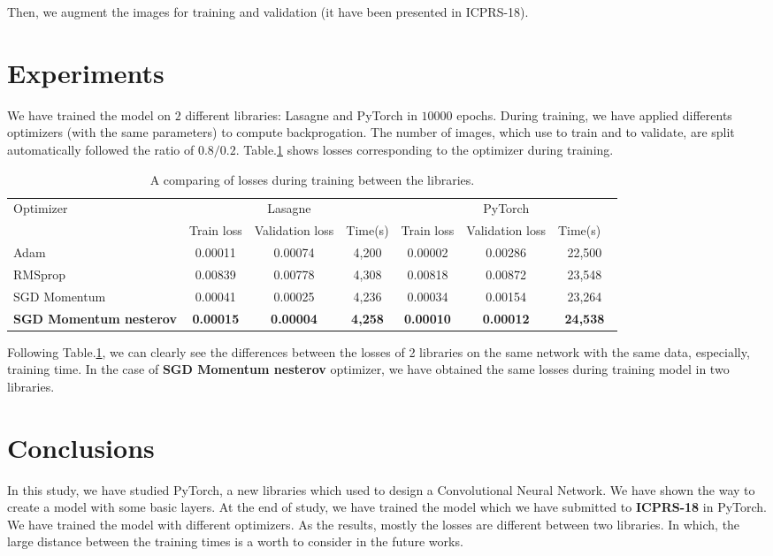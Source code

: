 \documentclass[12pt,a4paper]{article}
\begin{document}
Then, we augment the images for training and validation (it have been presented in ICPRS-18).

\section{Experiments}
We have trained the model on $2$ different libraries: Lasagne \cite{lasagne} and PyTorch in $10000$ epochs. During training, we have applied differents optimizers (with the same parameters) to compute backprogation. The number of images, which use to train and to validate, are split automatically followed the ratio of $0.8/0.2$. Table.\ref{tab2} shows losses corresponding to the optimizer during training.

\begin{table}[htbp]
\centering
\begin{tabular}{ | p{2cm} | c | c | c | c | c | c | }
\hline
	\multicolumn{1}{|p{2cm}|}{\multirow{2}{*}{Optimizer}} & \multicolumn{3}{c|}{Lasagne} &  \multicolumn{3}{c|}{PyTorch}  \\ \cline{2-7}
	 & Train loss & Validation loss & Time(s) & Train loss & Validation loss & Time(s) \  \\ \hline
	Adam & 0.00011 & 0.00074 & 4,200 & 0.00002 & 0.00286 & 22,500 \\ \hline
	RMSprop & 0.00839 & 0.00778 & 4,308 & 0.00818 & 0.00872 & 23,548 \\ \hline
	SGD Momentum & 0.00041 & 0.00025 & 4,236 & 0.00034 & 0.00154 & 23,264 \\ \hline
	\textbf{SGD Momentum nesterov} & \textbf{0.00015} & \textbf{0.00004} & \textbf{4,258} & \textbf{0.00010} & \textbf{0.00012} & \textbf{24,538} \\ \hline
\end{tabular}
\caption{\small{A comparing of losses during training between the libraries.}}
\label{tab2}
\end{table}
Following Table.\ref{tab2}, we can clearly see the differences between the losses of 2 libraries on the same network with the same data, especially, training time. In the case of \textbf{SGD Momentum nesterov} optimizer, we have obtained the same losses during training model in two libraries.
\section{Conclusions}
In this study, we have studied PyTorch, a new libraries which used to design a Convolutional Neural Network. We have shown the way to create a model with some basic layers. At the end of study, we have trained the model which we have submitted to \textbf{ICPRS-18} in PyTorch. We have trained the model with different optimizers. As the results, mostly the losses are different between two libraries. In which, the large distance between the training times is a worth to consider in the future works.


\end{document}
